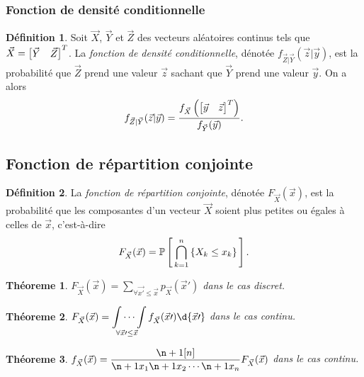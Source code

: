 \documentclass[11pt]{article}
\makeatletter
\renewcommand\P[1]{%
	\ensuremath{%
		\mathbb{P}\left[\,#1\,\right]%
	}%
}%
\newcommand\invec[1]{%
	\ensuremath{%
		\left[%
			\begin{matrix}%
				#1%
			\end{matrix}%
		\right]^T%
	}%
}%
\newtheorem{theoreme}{Théoreme}[section]
\theoremstyle{remark}
\theoremstyle{definition}
\newtheorem*{@definition}{Définition}
\newenvironment{definition}{%
	\begin{@definition}%
}{%
	\end{@definition}%
	\setcounter{property}{0}%
}
\makeatother
\begin{document}
\subsubsection{Fonction de densité conditionnelle}
\begin{definition}
	Soit $\vec{X}$, $\vec{Y}$ et $\vec{Z}$ des vecteurs aléatoires continus
	tels que $\vec{X}=\invec{\vec{Y}&\vec{Z}}$. La \textit{fonction de densité
	conditionnelle}, dénotée $f_{\vec{Z}|\vec{Y}}(\vec{z}|\vec{y})$, est la
	probabilité que $\vec{Z}$ prend une valeur $\vec{z}$ sachant que $\vec{Y}$
	prend une valeur $\vec{y}$. On a alors
	\begin{equation*}
		f_{\vec{Z}|\vec{Y}}(\vec{z}|\vec{y})
		=\frac{f_{\vec{X}}\left(\invec{\vec{y}&\vec{z}}\right)}
			{f_{\vec{Y}}(\vec{y})}.
	\end{equation*}
\end{definition}

\subsection{Fonction de répartition conjointe}
\begin{definition}
	La \textit{fonction de répartition conjointe}, dénotée
	$F_{\vec{X}}(\vec{x})$, est la probabilité que les composantes d'un vecteur
	$\vec{X}$ soient plus petites ou égales à celles de $\vec{x}$, c'est-à-dire
	\begin{equation*}
		F_{\vec{X}}(\vec{x})=\P{\bigcap_{k=1}^n\left\{X_k\leq x_k\right\}}.
	\end{equation*}
\end{definition}

\begin{theoreme}
	$F_{\vec{X}}(\vec{x})=\displaystyle\sum_{\forall\vec{x\prime}\leq\vec{x}}
	p_{\vec{X}}(\vec{x}\prime)$ dans le cas discret.
\end{theoreme}

\begin{theoreme}
	$F_{\vec{X}}(\vec{x})=\displaystyle\idotsint\limits_{\forall\vec{x}\prime
	\leq\vec{x}}f_{\vec{X}}(\vec{x}\prime)\d{\vec{x}\prime}$ dans le cas
	continu.
\end{theoreme}

\begin{theoreme}
	$f_{\vec{X}}(\vec{x})=\dfrac{\p[n]{}}{\p{x_1}\p{x_2}\cdots\p{x_n}}
	F_{\vec{X}}(\vec{x})$ dans le cas continu.
\end{theoreme}
\end{document}
